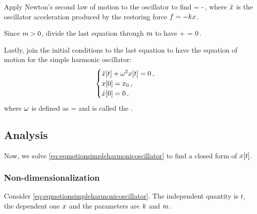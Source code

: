 Apply Newton's second law of motion to the oscillator to find
\beq
\mass\oacc = -\kspring\odisp\,,
\eeq
where $\ddot{x}$ is the oscillator acceleration produced by the restoring force $f = -kx$.

Since $m > 0$, divide the last equation through $m$ to have
\beq
\oacc + \dfrac{\kspring}{\mass}\odisp = 0\,.
\eeq

Lastly, join the initial conditions to the last equation to have the equation of motion for the simple harmonic oscillator:
\begin{equation}\label{eq:eqmotionsimpleharmonicoscillator}
  \begin{cases}
      \ddot{x}\!\left[{t}\right] + \omega^2x\!\left[{t}\right] = 0\,, \\
      x\!\left[{0}\right] = x_0\,, \\
      \dot{x}\!\left[{0}\right] = 0\,,
  \end{cases}
\end{equation}
where $\omega$ is defined as
\beq
\natfreq = \sqrt{\dfrac{\kspring}{\mass}}
\eeq
and is called the .


\subsection{Analysis}
Now, we solve \cref{eq:eqmotionsimpleharmonicoscillator} to find a closed form of $x\!\left[{t}\right]$.


\subsubsection{Non-dimensionalization}
Consider \cref{eq:eqmotionsimpleharmonicoscillator}. The independent quantity is $t$, the dependent one $x$ and the parameters are $k$ and $m$.

